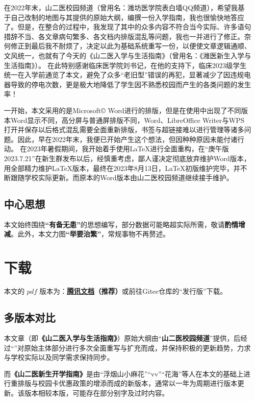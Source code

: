在2022年末，山二医校园频道（曾用名：潍坊医学院表白墙QQ频道），希望我基于自己改制的地图与其提供的原始大纲，编撰一份入学指南，我也很愉快地答应了。但是，在整合的过程中，我发现了其中的众多内容不符合当今实际、许多语句措辞不当、各文章病句繁多、各文档内排版混乱等问题，我也一并进行了修正。奈何修正到最后我不耐烦了，决定以此为基础系统重写一份，以便使文章逻辑通顺、文风统一，也就有了今天的《山二医入学与生活指南》（曾用名：《潍医新生入学与生活指南》）。
在此特别感谢临床医学院刘书记，在他的支持下，临床2023级学生统一在入学前通览了本文，避免了众多“老旧型”错误的再犯，显著减少了因违规电器导致的停电次数，更是极大地降低了学生因不熟悉校园而产生的各类问题的发生率！

一开始，本文采用的是Microsoft© Word进行的排版，但是在使用中出现了不同版本Word显示不同，高分屏与普通屏排版不同，Word、LibreOffice Writer与WPS打开并保存以后格式混乱需要全面重新排版，书签与超链接难以进行管理等诸多问题。因此，早在2022年末，我便已开始产生这个想法，但因种种原因未能付诸行动。
在2023年暑假期间，我开始着手使用\LaTeX 进行全面重构，在“庚午版 2023.7.21”在新生群发布以后，经慎重考虑，鄙人谨决定彻底放弃维护Word版本，用全部精力维护\LaTeX 版本，最终在2023年8月13日，\LaTeX 初版维护完毕，并不断跟随学校实际更新。而原本的Word版本由山二医校园频道继续接手维护。

\subsection[中心思想]{中心思想}
本文始终围绕\textbf{“有备无患”}的思想编写，部分数据可能略超实际所需，敬请\textbf{酌情增减}。此外，本文力图\textbf{“举要治繁”}，常规事物不再赘述。

\section[下载]{下载}
本文的 $pdf$ 版本\textbf{}为：\textbf{\uline{\href{https://docs.qq.com/s/ETcQ-ZFSrSsh6MK9bm773q}{腾讯文档}}（推荐）}或前往Gitee仓库的“发行版”下载。


\subsection[多版本对比]{多版本对比}
本文章（即\textbf{《山二医入学与生活指南》}）原始大纲由“\textbf{山二医校园频道}”提供，后经过“\textbf{}”对原始主体部分进行多次全面重写与扩充而成，并保持积极的更新趋势，力求与学校实际以及同学需求保持同步。

而\textbf{《山二医新生开学指南》}是由“浮烟山小麻花”“vv”“花海”等人在本文的基础上进行重排版与校园卡优惠政策的增添而成的新版本，通常以一年为周期进行版本更新。该版本相较本版，可能存在部分别字及过时内容。

